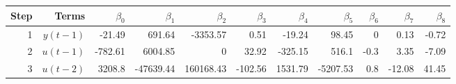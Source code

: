 \begin{tabular}{rrrrrrrrrrr}
Step & Terms & $\beta_{0}$ & $\beta_{1}$ & $\beta_{2}$ & $\beta_{3}$ & $\beta_{4}$ & $\beta_{5}$ & $\beta_{6}$ & $\beta_{7}$ & $\beta_{8}$ \\ 
\hline 
1 & $y(t-1)$ & -21.49 & 691.64 & -3353.57 & 0.51 & -19.24 & 98.45 & 0 & 0.13 & -0.72 \\ 
2 & $u(t-1)$ & -782.61 & 6004.85 & 0 & 32.92 & -325.15 & 516.1 & -0.3 & 3.35 & -7.09 \\ 
3 & $u(t-2)$ & 3208.8 & -47639.44 & 160168.43 & -102.56 & 1531.79 & -5207.53 & 0.8 & -12.08 & 41.45 \\ 
\hline 
\end{tabular}